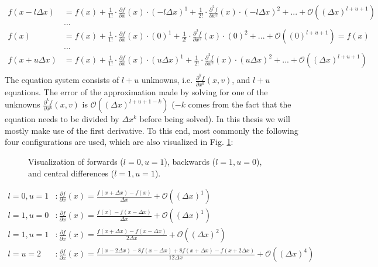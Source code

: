 \begin{align*}
f(x - l \Delta x) &= f(x) + \frac{1}{1!}\cdot\frac{\partial f}{\partial x}(x)\cdot (-l\Delta x)^1 + \frac{1}{2!}\cdot\frac{\partial^2 f}{\partial x^2}(x)\cdot (-l\Delta x)^2 + ... + \mathcal{O}((\Delta x) ^{l+u+1})\\
&...\\
f(x) &= f(x) + \frac{1}{1!}\cdot\frac{\partial f}{\partial x}(x)\cdot (0)^1 + \frac{1}{2!}\cdot\frac{\partial^2 f}{\partial x^2}(x)\cdot (0)^2 + ... + \mathcal{O}((0) ^{l+u+1})= f(x)\\
&...\\
f(x + u \Delta x) &= f(x) + \frac{1}{1!}\cdot\frac{\partial f}{\partial x}(x)\cdot (u\Delta x)^1 + \frac{1}{2!}\cdot\frac{\partial^2 f}{\partial x^2}(x)\cdot (u\Delta x)^2 + ... + \mathcal{O}((\Delta x) ^{l+u+1})\\
\end{align*}
The equation system consists of $l+u$ unknowns, i.e. $\frac{\partial^k f}{\partial x^k}(x,v)$, and $l+u$ equations.
The error of the approximation made by solving for one of the unknowns $\frac{\partial^k f}{\partial x^k}(x,v)$ is $\mathcal{O}((\Delta x) ^{l+u+1-k})$ ($-k$ comes from the fact that the equation needs to be divided by $\Delta x ^k$ before being solved).
In this thesis we will mostly make use of the first derivative.
To this end, most commonly the following four configurations are used, which are also visualized in Fig. \ref{fig:finite_differences}:

\begin{figure}[!h]
    \caption{Visualization of forwards ($l=0,u=1$), backwards ($l=1,u=0$), and central differences ($l=1,u=1$).}
    \label{fig:finite_differences}
\end{figure}

\begin{align*}
l=0,u=1&: \frac{\partial f}{\partial x}(x) = \frac{f(x+\Delta x) - f(x)}{\Delta x} + \mathcal{O}((\Delta x)^{1})\\
l=1,u=0&: \frac{\partial f}{\partial x}(x) = \frac{f(x) - f(x-\Delta x)}{\Delta x} + \mathcal{O}((\Delta x)^{1})\\
l=1,u=1&: \frac{\partial f}{\partial x}(x) = \frac{f(x + \Delta x) - f(x-\Delta x)}{2\Delta x} + \mathcal{O}((\Delta x)^{2})\\
l=u=2&: \frac{\partial f}{\partial x}(x) = \frac{f(x-2\Delta x) -8 f(x-\Delta x) + 8 f(x+\Delta x) - f(x+2\Delta x)}{12\Delta x} + \mathcal{O}((\Delta x)^{4})\\
\end{align*}


